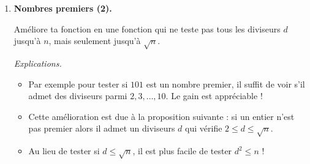 \documentclass[11pt,class=report,crop=false]{standalone}
\begin{document}
\begin{activite}
\begin{enumerate}
  Par exemple  renvoie ,  renvoie .
  
  \item \textbf{Nombres premiers (2).}
  
   Améliore ta fonction en une fonction  qui ne teste pas tous les diviseurs $d$ jusqu'à $n$, mais seulement jusqu'à $\sqrt{n}$.
   
  \emph{Explications.}
  \begin{itemize}
    \item Par exemple pour tester si $101$ est un nombre premier, il suffit de voir s'il admet des diviseurs parmi $2,3,\ldots,10$. Le gain est appréciable !
    
    \item Cette amélioration est due à la proposition suivante : si un entier n'est pas premier alors il admet un diviseurs $d$ qui vérifie $2 \le d \le \sqrt{n}$.
    
    \item Au lieu de tester si $d \le \sqrt{n}$, il est plus facile de tester $d^2 \le n$ !
   \end{itemize} 
  
   
\end{enumerate}   
     
\end{activite}
\end{document}
